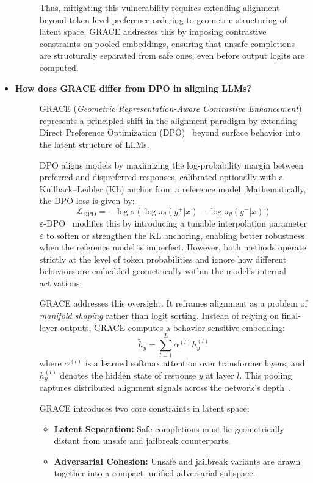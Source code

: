 \begin{itemize}[leftmargin=15pt,nolistsep]
\begin{description}
Thus, mitigating this vulnerability requires extending alignment beyond token-level preference ordering to geometric structuring of latent space. GRACE addresses this by imposing contrastive constraints on pooled embeddings, ensuring that unsafe completions are structurally separated from safe ones, even before output logits are computed.
\end{description}


\item[\ding{93}] { \selectfont \textbf{How does GRACE differ from DPO in aligning LLMs?}}
\begin{description}
\item[]
GRACE (\textit{Geometric Representation-Aware Contrastive Enhancement}) represents a principled shift in the alignment paradigm by extending Direct Preference Optimization (DPO)~\cite{rafailov2023direct} beyond surface behavior into the latent structure of LLMs. 

\medskip
DPO aligns models by maximizing the log-probability margin between preferred and dispreferred responses, calibrated optionally with a Kullback–Leibler (KL) anchor from a reference model. Mathematically, the DPO loss is given by:
\[
\mathcal{L}_{\text{DPO}} = -\log \sigma\left(\log \pi_\theta(y^{+}|x) - \log \pi_\theta(y^{-}|x)\right)
\]
$\varepsilon$-DPO~\cite{chen2023epsilon} modifies this by introducing a tunable interpolation parameter $\varepsilon$ to soften or strengthen the KL anchoring, enabling better robustness when the reference model is imperfect. However, both methods operate strictly at the level of token probabilities and ignore how different behaviors are embedded geometrically within the model’s internal activations.

\medskip
GRACE addresses this oversight. It reframes alignment as a problem of \emph{manifold shaping} rather than logit sorting. Instead of relying on final-layer outputs, GRACE computes a behavior-sensitive embedding:
\[
\tilde{h}_y = \sum_{l=1}^{L} \alpha^{(l)} h_y^{(l)}
\]
where $\alpha^{(l)}$ is a learned softmax attention over transformer layers, and $h_y^{(l)}$ denotes the hidden state of response $y$ at layer $l$. This pooling captures distributed alignment signals across the network’s depth~\cite{belrose2023language, mu2023layers}.

\medskip
GRACE introduces two core constraints in latent space:
\begin{itemize}[leftmargin=1em,itemsep=2pt]
  \item \textbf{Latent Separation:} Safe completions must lie geometrically distant from unsafe and jailbreak counterparts.
  \item \textbf{Adversarial Cohesion:} Unsafe and jailbreak variants are drawn together into a compact, unified adversarial subspace.
\end{itemize}


\end{description}
\end{itemize}
